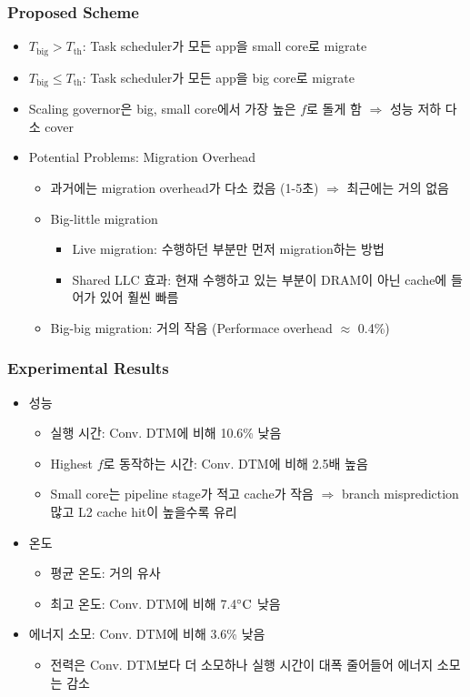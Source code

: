 \subsubsection*{Proposed Scheme}
\begin{itemize}
    \item $T_\mathrm{big}>T_\mathrm{th}$: Task scheduler가 모든 app을 small core로 migrate
    \item $T_\mathrm{big}\leq T_\mathrm{th}$: Task scheduler가 모든 app을 big core로 migrate
    \item Scaling governor은 big, small core에서 가장 높은 $f$로 돌게 함 $\Rightarrow$ 성능 저하 다소 cover
    \item Potential Problems: Migration Overhead
    \begin{itemize}
        \item 과거에는 migration overhead가 다소 컸음 (1-5초) $\Rightarrow$ 최근에는 거의 없음
        \item Big-little migration
        \begin{itemize}
            \item Live migration: 수행하던 부분만 먼저 migration하는 방법
            \item Shared LLC 효과: 현재 수행하고 있는 부분이 DRAM이 아닌 cache에 들어가 있어 훨씬 빠름
        \end{itemize}
        \item Big-big migration: 거의 작음 (Performace overhead $\approx$ 0.4\%)
    \end{itemize}
\end{itemize}

\subsubsection*{Experimental Results}
\begin{itemize}
    \item 성능
    \begin{itemize}
        \item 실행 시간: Conv. DTM에 비해 10.6\% 낮음
        \item Highest $f$로 동작하는 시간: Conv. DTM에 비해 2.5배 높음
        \item Small core는 pipeline stage가 적고 cache가 작음 $\Rightarrow$ branch misprediction 많고 L2 cache hit이 높을수록 유리
    \end{itemize}
    \newpage
    \item 온도
    \begin{itemize}
        \item 평균 온도: 거의 유사
        \item 최고 온도: Conv. DTM에 비해 7.4$^{\circ}\mathrm{C}$ 낮음
    \end{itemize}
    \item 에너지 소모: Conv. DTM에 비해 3.6\% 낮음
    \begin{itemize}
        \item 전력은 Conv. DTM보다 더 소모하나 실행 시간이 대폭 줄어들어 에너지 소모는 감소
    \end{itemize}
\end{itemize}

